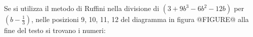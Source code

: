 Se si utilizza il metodo di Ruffini nella divisione di
$\left( 3 + 9b^3 - 6b^2 -12b \right)$ per $\left( b -\frac{1}{3}  \right)$,
nelle posizioni 9, 10, 11, 12 del diagramma 
in figura @FIGURE@ alla fine del testo
si trovano i numeri:
